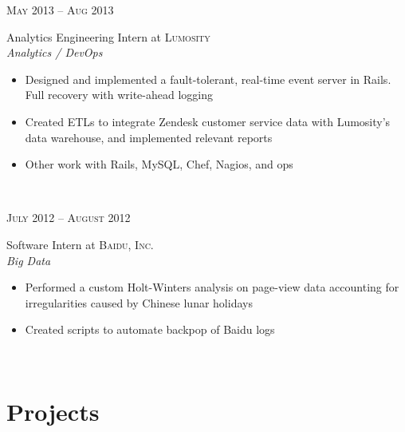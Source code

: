 \documentclass[10pt]{article} %
\begin{document}
{\begin{minipage}[t]{0.5\textwidth}

{\raggedleft\textsc{May 2013 -- Aug 2013}\par}

{\raggedright\large Analytics Engineering Intern at \textsc{Lumosity}\\
\textit{Analytics / DevOps}\\[5pt]}

\normalsize{
  \begin{itemize}
  \item Designed and implemented a fault-tolerant, real-time event server
    in Rails. Full recovery with write-ahead logging
  \item Created ETLs to integrate Zendesk customer service data with
    Lumosity's data warehouse, and implemented relevant reports
  \item Other work with Rails, MySQL, Chef, Nagios, and ops
  \end{itemize}
}\\


{\raggedleft\textsc{July 2012 -- August 2012}\par}

{\raggedright\large Software Intern at \textsc{Baidu, Inc.}\\
\textit{Big Data}\\[5pt]}

\normalsize{
  \begin{itemize}
  \item Performed a custom Holt-Winters analysis on page-view data
    accounting for irregularities caused by Chinese lunar holidays
  \item Created scripts to automate backpop of Baidu logs
  \end{itemize}
}\\


\section{Projects}


\end{minipage}}
\end{document}

